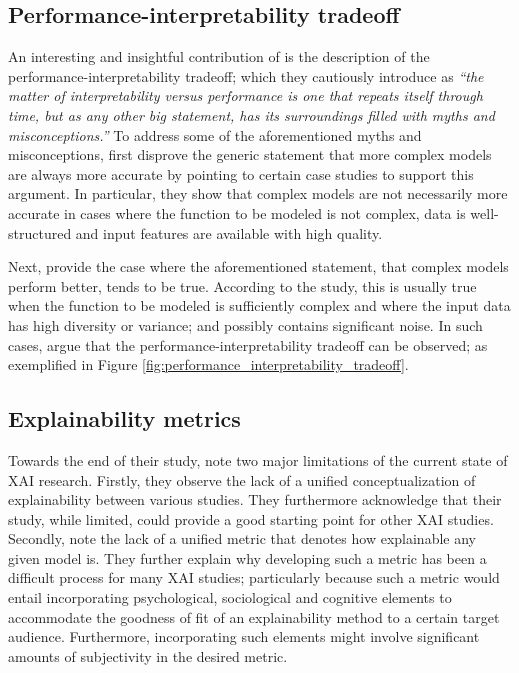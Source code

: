 \subsection{Performance-interpretability tradeoff}

An interesting and insightful contribution of \citet[Section 5.1, Page 18]{arrieta2020explainable} is the description of the performance-interpretability tradeoff; which they cautiously introduce as \textit{``the matter of interpretability versus performance is one that repeats itself through time, but as any other big statement, has its surroundings filled with myths and misconceptions.''} To address some of the aforementioned myths and misconceptions, \citet{arrieta2020explainable} first disprove the generic statement that more complex models are always more accurate by pointing to certain case studies to support this argument. In particular, they show that complex models are not necessarily more accurate in cases where the function to be modeled is not complex, data is well-structured and input features are available with high quality.

Next, \citet{arrieta2020explainable} provide the case where the aforementioned statement, that complex models perform better, tends to be true. According to the study, this is usually true when the function to be modeled is sufficiently complex and where the input data has high diversity or variance; and possibly contains significant noise. In such cases, \citet{arrieta2020explainable} argue that the performance-interpretability tradeoff can be observed; as exemplified in Figure \ref{fig:performance_interpretability_tradeoff}.
 
\subsection{Explainability metrics}

\label{section:xai-metrics}

Towards the end of their study, \citet{arrieta2020explainable} note two major limitations of the current state of XAI research. Firstly, they observe the lack of a unified conceptualization of explainability between various studies. They furthermore acknowledge that their study, while limited, could provide a good starting point for other XAI studies. Secondly, \citet{arrieta2020explainable} note the lack of a unified metric that denotes how explainable any given model is. They further explain why developing such a metric has been a difficult process for many XAI studies; particularly because such a metric would entail incorporating psychological, sociological and cognitive elements to accommodate the goodness of fit of an explainability method to a certain target audience. Furthermore, incorporating such elements might involve significant amounts of subjectivity in the desired metric.

